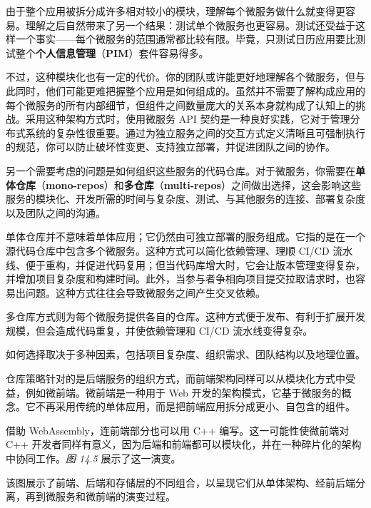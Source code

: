 \label{idx:1387}
\label{idx:1388}
由于整个应用被拆分成许多相对较小的模块，理解每个微服务做什么就变得更容易。理解之后自然带来了另一个结果：测试单个微服务也更容易。测试还受益于这样一个事实——每个微服务的范围通常都比较有限。毕竟，只测试日历应用要比测试整个\textbf{个人信息管理}（\textbf{PIM}）套件容易得多。

不过，这种模块化也有一定的代价。你的团队或许能更好地理解各个微服务，但与此同时，他们可能更难把握整个应用是如何组成的。虽然并不需要了解构成应用的每个微服务的所有内部细节，但组件之间数量庞大的关系本身就构成了认知上的挑战。采用这种架构方式时，使用微服务 API 契约是一种良好实践，它对于管理分布式系统的复杂性很重要。通过为独立服务之间的交互方式定义清晰且可强制执行的规范，你可以防止破坏性变更、支持独立部署，并促进团队之间的协作。

\label{idx:1389}
\label{idx:1390}
另一个需要考虑的问题是如何组织这些服务的代码仓库。对于微服务，你需要在\textbf{单体仓库}（\textbf{mono-repos}）和\textbf{多仓库}（\textbf{multi-repos}）之间做出选择，这会影响这些服务的模块化、开发所需的时间与复杂度、测试、与其他服务的连接、部署复杂度以及团队之间的沟通。


\label{idx:1391}
单体仓库并不意味着单体应用；它仍然由可独立部署的服务组成。它指的是在一个源代码仓库中包含多个微服务。这种方式可以简化依赖管理、理顺 CI/CD 流水线、便于重构，并促进代码复用；但当代码库增大时，它会让版本管理变得复杂，并增加项目复杂度和构建时间。此外，当参与者争相向项目提交拉取请求时，也容易出问题。这种方式往往会导致微服务之间产生交叉依赖。

\label{idx:1392}
多仓库方式则为每个微服务提供各自的仓库。这种方式便于发布、有利于扩展开发规模，但会造成代码重复，并使依赖管理和 CI/CD 流水线变得复杂。

如何选择取决于多种因素，包括项目复杂度、组织需求、团队结构以及地理位置。

仓库策略针对的是后端服务的组织方式，而前端架构同样可以从模块化方式中受益，例如微前端。微前端是一种用于 Web 开发的架构模式，它基于微服务的概念。它不再采用传统的单体应用，而是把前端应用拆分成更小、自包含的组件。

借助 WebAssembly，连前端部分也可以用 C++ 编写。这一可能性使微前端对 C++ 开发者同样有意义，因为后端和前端都可以模块化，并在一种碎片化的架构中协同工作。\emph{图 14.5} 展示了这一演变。


\label{idx:1393}
该图展示了前端、后端和存储层的不同组合，以呈现它们从单体架构、经前后端分离，再到微服务和微前端的演变过程。

